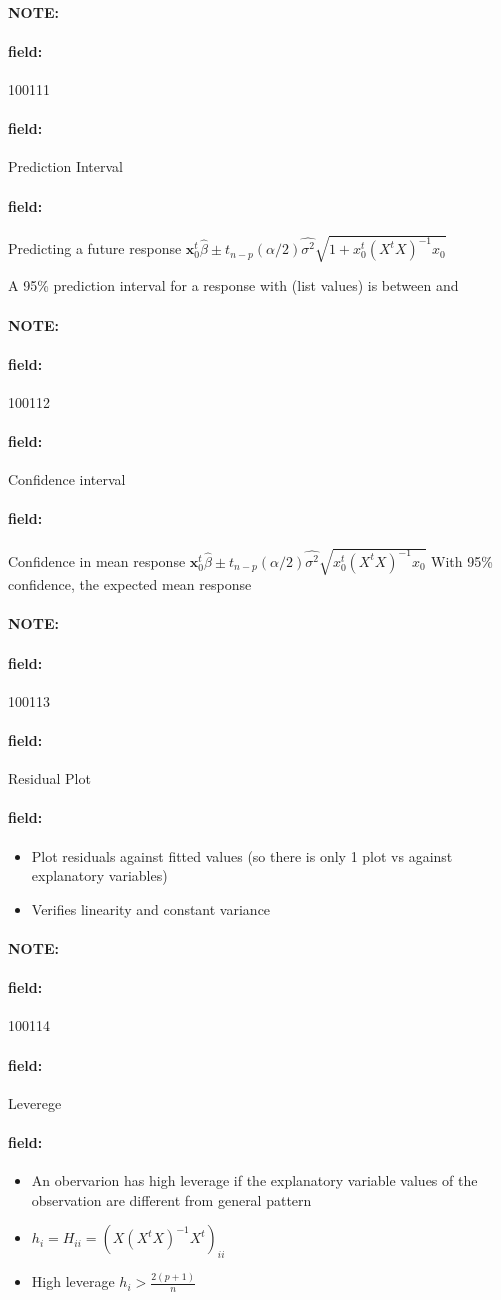 \documentclass[12pt]{article}
\newenvironment{note}{\paragraph{NOTE:}}{}
\newenvironment{field}{\paragraph{field:}}{}
\begin{document}
\begin{note} \begin{field} \tiny 100111 \end{field}
 \begin{field}
  Prediction Interval
 \end{field}
 \begin{field}
  Predicting a future response
  $\mathbf{x}_0^t \hat{\beta} \pm t_{n-p}(\alpha/2)\hat{\sigma^2} \sqrt{1 + x_0^t(X^tX)^{-1}x_0}$

  A 95\% prediction interval for a response with (list values) is between and
 \end{field}
\end{note}



\begin{note} \begin{field} \tiny 100112 \end{field}
 \begin{field}
  Confidence interval
 \end{field}
 \begin{field}
  Confidence in mean response $\mathbf{x}_0^t \hat{\beta} \pm t_{n-p}(\alpha/2)\hat{\sigma^2} \sqrt{x_0^t(X^tX)^{-1}x_0}$
  With 95\% confidence, the expected mean response
 \end{field}
\end{note}


\begin{note} \begin{field} \tiny 100113 \end{field}
 \begin{field}
  Residual Plot
 \end{field}
 \begin{field}
  \begin{itemize}
   \item Plot residuals against fitted values (so there is only 1 plot vs against explanatory variables)
   \item Verifies linearity and constant variance
  \end{itemize}
 \end{field}
\end{note}

\begin{note} \begin{field} \tiny 100114 \end{field}
 \begin{field}
  Leverege
 \end{field}
 \begin{field}
  \begin{itemize}
   \item An obervarion has high leverage if the explanatory variable values of the observation are different from general pattern
   \item $h_i = H_{ii} = (X(X^tX)^{-1}X^t)_{ii}$
   \item High leverage $h_i > \frac{2(p+1)}{n}$
  \end{itemize}
 \end{field}
\end{note}
\end{document}
